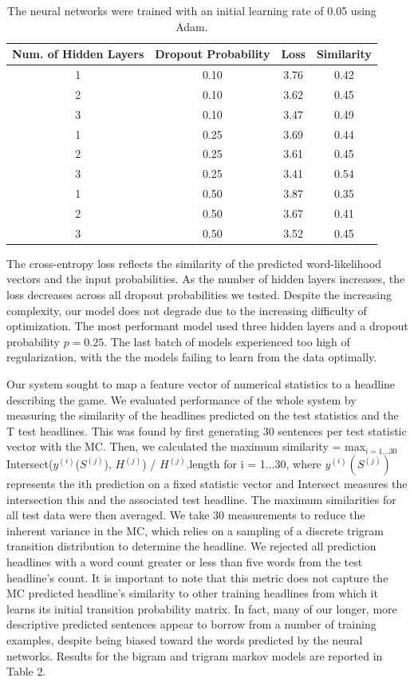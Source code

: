 \documentclass[12pt, journal]{IEEEtran}
\begin{document}
\begin{table}[!t]
\renewcommand{\arraystretch}{1.3}
\caption{The neural networks were trained with an initial learning rate of 0.05 using Adam.}
\label{table_example}
\centering
\begin{tabular}{|c||c||c||c|}
\hline
Num. of Hidden Layers & Dropout Probability & Loss & Similarity \\
\hline
1 & 0.10 & 3.76 & 0.42\\
2 & 0.10 & 3.62 & 0.45\\
3 & 0.10 & 3.47 & 0.49\\
1 & 0.25 & 3.69 & 0.44\\
2 & 0.25 & 3.61 & 0.45\\
3 & 0.25 & 3.41 & 0.54\\
1 & 0.50 & 3.87 & 0.35\\
2 & 0.50 & 3.67 & 0.41\\
3 & 0.50 & 3.52 & 0.45\\
\hline
\end{tabular}
\end{table}

The cross-entropy loss reflects the similarity of the predicted word-likelihood vectors and the input probabilities. As the number of hidden layers increases, the loss decreases across all dropout probabilities we tested. Despite the increasing complexity, our model does not degrade due to the increasing difficulty of optimization. The most performant model used three hidden layers and a dropout probability $p =0.25$. The last batch of models experienced too high of regularization, with the the models failing to learn from the data optimally. 

Our system sought to map a feature vector of numerical statistics to a headline describing the game. We evaluated performance of the whole system by measuring the similarity of the headlines predicted on the test statistics and the T test headlines. This was found by first generating 30 sentences per test statistic vector with the MC. Then, we calculated the maximum similarity = max$_{i=1...30}$ Intersect($y^{(i)}$($S^{(j)}$), $H^{(j)}$) / $H^{(j)}$.length for i = 1...30, where $y^{(i)}(S^{(j)})$ represents the ith prediction on a fixed statistic vector and Intersect measures the intersection this and the associated test headline. The maximum similarities for all test data were then averaged. We take 30 measurements to reduce the inherent variance in the MC, which relies on a sampling of a discrete trigram transition distribution to determine the headline. We rejected all prediction headlines with a word count greater or less than five words from the test headline's count. It is important to note that this metric does not capture the MC predicted headline's similarity to other training headlines from which it learns its initial transition probability matrix. In fact, many of our longer, more descriptive predicted sentences appear to borrow from a number of training examples, despite being biased toward the words predicted by the neural networks. Results for the bigram and trigram markov models are reported in Table 2. 
\end{document}
